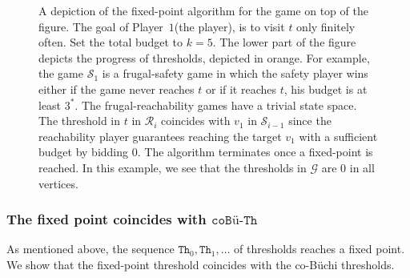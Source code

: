 \documentclass{article}\providecommand{\nequiv}{\not\equiv}\usepackage[a4paper,margin=20mm]{geometry}
\newcommand{\PO}{Player~$1$\xspace}
\newcommand{\G}{{\mathcal G}}
\newcommand{\R}{{\mathcal R}}
\renewcommand{\S}{{\mathcal S}}
\newcommand{\thresh}{\texttt{Th}\xspace}
\newcommand{\coTh}{\texttt{coB\"u-Th}}
\newcommand{\coBuchi}{\text{co-B\"uchi}\xspace}
\begin{document}
\begin{figure}
\begin{subfigure}[t]{0.95\textwidth}
			
	\end{subfigure}
	\caption{A depiction of the fixed-point algorithm for the \coBuchi game on top of the figure. The goal of \PO (the \coBuchi player), is to visit $t$ only finitely often. Set the total budget to $k=5$. The lower part of the figure depicts the progress of thresholds, depicted in orange.
	For example, the game $\S_1$ is a frugal-safety game in which the safety player wins either if the game never reaches $t$ or if it reaches $t$, his budget is at least $3^*$. The frugal-reachability games have a trivial state space. The threshold in $t$ in $\R_i$ coincides with $v_1$ in $\S_{i-1}$ since the reachability player guarantees reaching the target $v_1$ with a sufficient budget by bidding $0$.
The algorithm terminates once a fixed-point is reached. In this example, we see that the thresholds in \(\G\) are \(0\) in all vertices.}
\label{fig:Buchi}
\end{figure}




\subsubsection{The fixed point coincides with $\coTh$}
As mentioned above, the sequence $\thresh_0,\thresh_1,\ldots$ of thresholds reaches a fixed point. We show that the fixed-point threshold coincides with the co-B\"uchi thresholds. 
\end{document}
